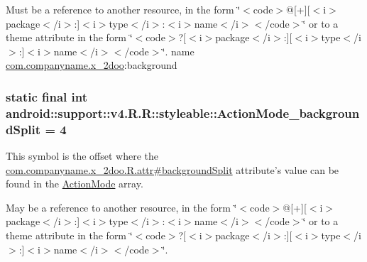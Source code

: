 Must be a reference to another resource, in the form \char`\"{}$<$code$>$@\mbox{[}+\mbox{]}\mbox{[}$<$i$>$package$<$/i$>$:\mbox{]}$<$i$>$type$<$/i$>$:$<$i$>$name$<$/i$>$$<$/code$>$\char`\"{} or to a theme attribute in the form \char`\"{}$<$code$>$?\mbox{[}$<$i$>$package$<$/i$>$:\mbox{]}\mbox{[}$<$i$>$type$<$/i$>$:\mbox{]}$<$i$>$name$<$/i$>$$<$/code$>$\char`\"{}.  name \hyperlink{namespacecom_1_1companyname_1_1x__2doo}{com.companyname.x\_\-2doo}:background \hypertarget{classandroid_1_1support_1_1v4_1_1_r_1_1styleable_8c52d714dfc0ee49d394e2c5f6d4d83c}{
\subsubsection[{ActionMode\_\-backgroundSplit}]{\setlength{\rightskip}{0pt plus 5cm}static final int android::support::v4.R.R::styleable::ActionMode\_\-backgroundSplit = 4}}
\label{classandroid_1_1support_1_1v4_1_1_r_1_1styleable_8c52d714dfc0ee49d394e2c5f6d4d83c}


This symbol is the offset where the \hyperlink{classcom_1_1companyname_1_1x__2doo_1_1_r_1_1attr_8fda96db8ccf56c969203da5517b488e}{com.companyname.x\_\-2doo.R.attr\#backgroundSplit} attribute's value can be found in the \hyperlink{classandroid_1_1support_1_1v4_1_1_r_1_1styleable_cb0fd98eb07ef010055f95821e8da84e}{ActionMode} array.

May be a reference to another resource, in the form \char`\"{}$<$code$>$@\mbox{[}+\mbox{]}\mbox{[}$<$i$>$package$<$/i$>$:\mbox{]}$<$i$>$type$<$/i$>$:$<$i$>$name$<$/i$>$$<$/code$>$\char`\"{} or to a theme attribute in the form \char`\"{}$<$code$>$?\mbox{[}$<$i$>$package$<$/i$>$:\mbox{]}\mbox{[}$<$i$>$type$<$/i$>$:\mbox{]}$<$i$>$name$<$/i$>$$<$/code$>$\char`\"{}. 

